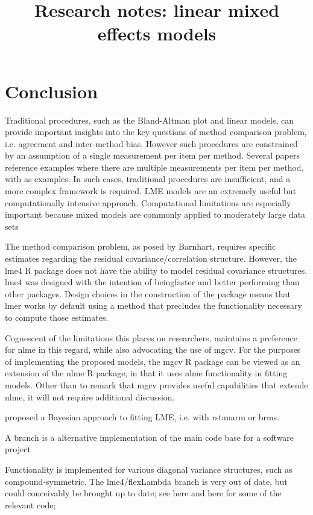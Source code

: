 \documentclass[12pt, a4paper]{report}
\title{Research notes: linear mixed effects models}
\author{ } \date{ }
\theoremstyle{plain}
\theoremstyle{definition}
\theoremstyle{remark}
\begin{document}
\newpage

\section{Conclusion}

Traditional procedures, such as the Bland-Altman plot and linear models, can provide important insights into the key questions of method comparison problem, i.e. agreement and inter-method bias. However such procedures are constrained by an assumption of a single measurement per item per method. Several papers reference examples where there are multiple measurements per item per method, with \citet{BA99,BXC2008,ARoy2009} as examples. In such cases, traditional procedures are insufficient, and a more complex framework is required. 
LME models are an extremely useful but computationally intensive approach. Computational
limitations are especially important because mixed models are commonly applied to
moderately large data sets


The method comparison problem, as posed by Barnhart, requires specific estimates regarding the residual covariance/correlation structure. 
However, the lme4 R package does not have the ability to model residual covariance structures.
lme4 was designed with the intention of beingfaster and better performing than other packages. Design choices 
in the construction of the package means that lmer works by default using a method that precludes the functionality 
necessary to compute those estimates.

Cognescent of the limitations this places on researchers,\citet{Clark} maintains a preference for nlme in this regard, while also advocating the use of
mgcv. For the purposes of implementing the proposed models, the mgcv R package can be viewed as an extension of the nlme R package, in
that it uses nlme functionality in fitting models. Other than to remark that mgcv provides useful capabilities that extende nlme, it will not require additional discussion.

 \citet{Clark} proposed a Bayesian approach to fitting LME, i.e. with rstanarm or brms. 
 




A branch is a alternative implementation of the main code base for a software project

Functionality is implemented for various diagonal variance structures, such as compound-symmetric.
The lme4/flexLambda branch is very out of date, but could conceivably be brought up to date; see here and here for some of the relevant code; 






\end{document}
